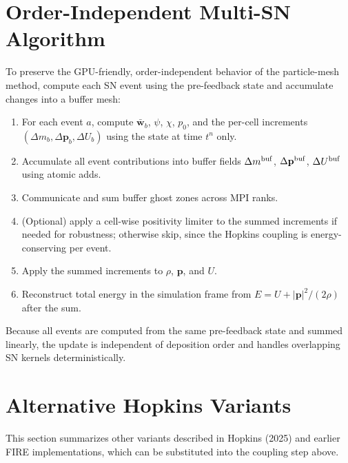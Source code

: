 \documentclass[11pt]{article}
\begin{document}
\section{Order-Independent Multi-SN Algorithm}
To preserve the GPU-friendly, order-independent behavior of the particle-mesh
method, compute each SN event using the pre-feedback state and accumulate
changes into a buffer mesh:
\begin{enumerate}
\item For each event $a$, compute $\bar{\mathbf w}_{b}$, $\psi$, $\chi$, $p_{0}$, and
the per-cell increments $(\Delta m_{b}, \Delta \mathbf p_{b}, \Delta U_{b})$
using the state at time $t^{n}$ only.
\item Accumulate all event contributions into buffer fields
$\Delta m^{\rm buf}$, $\Delta \mathbf p^{\rm buf}$, $\Delta U^{\rm buf}$
using atomic adds.
\item Communicate and sum buffer ghost zones across MPI ranks.
\item (Optional) apply a cell-wise positivity limiter to the summed increments
if needed for robustness; otherwise skip, since the Hopkins coupling is
energy-conserving per event.
\item Apply the summed increments to $\rho$, $\mathbf p$, and $U$.
\item Reconstruct total energy in the simulation frame from
$E=U+|\mathbf p|^{2}/(2\rho)$ after the sum.
\end{enumerate}
Because all events are computed from the same pre-feedback state and summed
linearly, the update is independent of deposition order and handles overlapping
SN kernels deterministically.

\section{Alternative Hopkins Variants}
This section summarizes other variants described in Hopkins (2025) and earlier
FIRE implementations, which can be substituted into the coupling step above.
\end{document}
